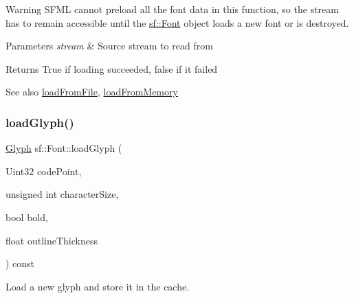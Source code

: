 \begin{DoxyWarning}{Warning}
S\+F\+ML cannot preload all the font data in this function, so the stream has to remain accessible until the \mbox{\hyperlink{classsf_1_1_font}{sf\+::\+Font}} object loads a new font or is destroyed.
\end{DoxyWarning}

\begin{DoxyParams}{Parameters}
{\em stream} & Source stream to read from\\
\hline
\end{DoxyParams}
\begin{DoxyReturn}{Returns}
True if loading succeeded, false if it failed
\end{DoxyReturn}
\begin{DoxySeeAlso}{See also}
\mbox{\hyperlink{classsf_1_1_font_ab020052ef4e01f6c749a85571c0f3fd1}{load\+From\+File}}, \mbox{\hyperlink{classsf_1_1_font_abf2f8d6de31eb4e1db02e061c323e346}{load\+From\+Memory}} \begin{DoxyVerb}\end{DoxyVerb}
 
\end{DoxySeeAlso}
\mbox{\label{classsf_1_1_font_aa85d44ca0c95b5826cb4adf96a5076ba}} 
\subsubsection{\texorpdfstring{loadGlyph()}{loadGlyph()}}
{\footnotesize\ttfamily \mbox{\hyperlink{classsf_1_1_glyph}{Glyph}} sf\+::\+Font\+::load\+Glyph (\begin{DoxyParamCaption}\item[{Uint32}]{code\+Point,  }\item[{unsigned int}]{character\+Size,  }\item[{bool}]{bold,  }\item[{float}]{outline\+Thickness }\end{DoxyParamCaption}) const\hspace{0.3cm}{\ttfamily [private]}}



Load a new glyph and store it in the cache. 


